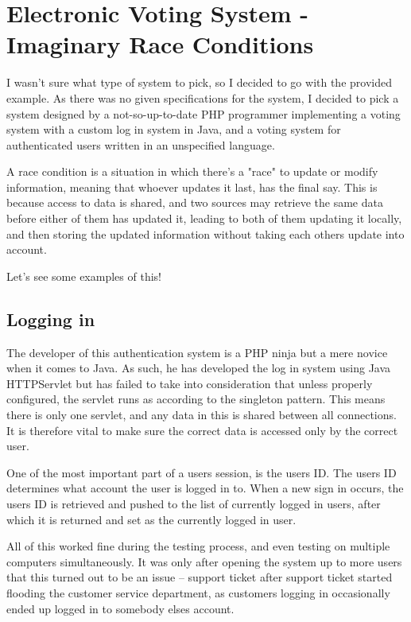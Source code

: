 \section{Electronic Voting System - Imaginary Race Conditions}
I wasn't sure what type of system to pick, so I decided to go with the provided example. As there was no given specifications for the system, I decided to pick a system designed by a not-so-up-to-date PHP programmer implementing a voting system with a custom log in system in Java, and a voting system for authenticated users written in an unspecified language.

A race condition is a situation in which there's a "race" to update or modify information, meaning that whoever updates it last, has the final say. This is because access to data is shared, and two sources may retrieve the same data before either of them has updated it, leading to both of them updating it locally, and then storing the updated information without taking each others update into account. 

Let's see some examples of this!

\subsection{Logging in}
The developer of this authentication system is a PHP ninja but a mere novice when it comes to Java. As such, he has developed the log in system using Java HTTPServlet but has failed to take into consideration that unless properly configured, the servlet runs as according to the singleton pattern. This means there is only one servlet, and any data in this is shared between all connections. It is therefore vital to make sure the correct data is accessed only by the correct user.

One of the most important part of a users session, is the users ID. The users ID determines what account the user is logged in to. When a new sign in occurs, the users ID is retrieved and pushed to the list of currently logged in users, after which it is returned and set as the currently logged in user.

All of this worked fine during the testing process, and even testing on multiple computers simultaneously. It was only after opening the system up to more users that this turned out to be an issue -- support ticket after support ticket started flooding the customer service department, as customers logging in occasionally ended up logged in to somebody elses account. \cite{javamemberfield}

